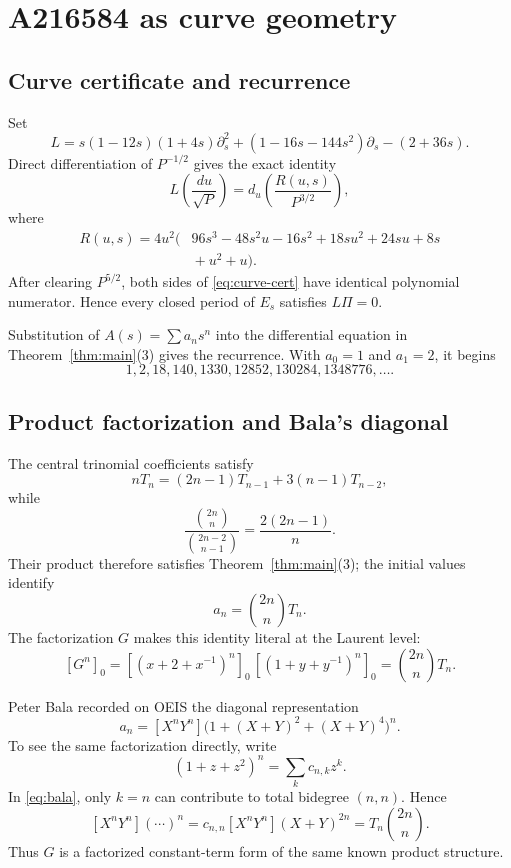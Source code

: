 \documentclass[11pt,fleqn]{article}
\theoremstyle{plain}
\begin{document}
\clearpage

\section{A216584 as curve geometry}

\subsection*{Curve certificate and recurrence}
Set
\[
 L=s(1-12s)(1+4s)\partial_s^2
 +(1-16s-144s^2)\partial_s-(2+36s).
\]
Direct differentiation of \(P^{-1/2}\) gives the exact identity
\begin{equation}\label{eq:curve-cert}
 L\!\left(\frac{du}{\sqrt P}\right)
 =d_u\!\left(\frac{R(u,s)}{P^{3/2}}\right),
\end{equation}
where
\begin{equation}\label{eq:Rcurve}
\begin{aligned}
 R(u,s)=4u^2\bigl(&96s^3-48s^2u-16s^2+18su^2+24su+8s\\
                 &{}+u^2+u\bigr).
\end{aligned}
\end{equation}
After clearing \(P^{5/2}\), both sides of \eqref{eq:curve-cert} have
identical polynomial numerator.  Hence every closed period of \(E_s\) satisfies \(L\Pi=0\).

Substitution of \(A(s)=\sum a_ns^n\) into the differential equation in
Theorem~\ref{thm:main}(3) gives the recurrence.  With \(a_0=1\) and \(a_1=2\), it begins
\[
 1,2,18,140,1330,12852,130284,1348776,\ldots .
\]

\subsection*{Product factorization and Bala's diagonal}
The central trinomial coefficients satisfy
\[
 nT_n=(2n-1)T_{n-1}+3(n-1)T_{n-2},
\]
while
\[
 \frac{\binom{2n}{n}}{\binom{2n-2}{n-1}}
 =\frac{2(2n-1)}{n}.
\]
Their product therefore satisfies Theorem~\ref{thm:main}(3); the initial values
identify
\begin{equation}\label{eq:hadamard}
 a_n=\binom{2n}{n}T_n.
\end{equation}
The factorization $G$ makes this identity literal at the Laurent
level:
\[
 [G^n]_0
 =[(x+2+x^{-1})^n]_0\,
  [(1+y+y^{-1})^n]_0
 =\binom{2n}{n}T_n.
\]

Peter Bala recorded on OEIS the diagonal representation
\begin{equation}\label{eq:bala}
 a_n=[X^nY^n]\bigl(1+(X+Y)^2+(X+Y)^4\bigr)^n.
\end{equation}
To see the same factorization directly, write
\[
 (1+z+z^2)^n=\sum_k c_{n,k}z^k.
\]
In \eqref{eq:bala}, only \(k=n\) can contribute to total bidegree
\((n,n)\).  Hence
\[
 [X^nY^n](\cdots)^n
 =c_{n,n}[X^nY^n](X+Y)^{2n}
 =T_n\binom{2n}{n}.
\]
Thus $G$ is a factorized constant-term form of the same known
product structure.
\end{document}
